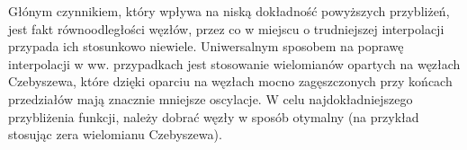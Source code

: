 \documentclass{article}
\begin{document}
Głónym czynnikiem, który wpływa na niską dokładność powyższych przybliżeń, jest fakt równoodległości węzłów, przez co w miejscu o trudniejszej interpolacji przypada ich stosunkowo niewiele. Uniwersalnym sposobem na poprawę interpolacji w ww. przypadkach jest stosowanie wielomianów opartych na węzłach Czebyszewa, które dzięki oparciu na węzłach mocno zagęszczonych przy końcach przedziałów mają znacznie mniejsze oscylacje. W celu najdokładniejszego przybliżenia funkcji, należy dobrać węzły w sposób otymalny (na przykład stosując zera wielomianu Czebyszewa).
\end{document}
